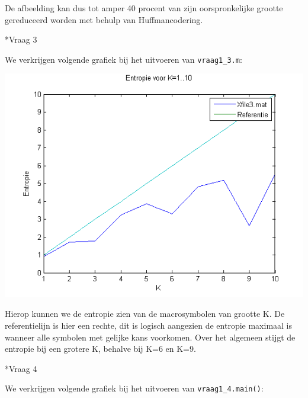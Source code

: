 \documentclass[]{article}
\begin{document}
\begin{section}
\begin{subsection}
        De afbeelding kan dus tot amper 40 procent van zijn
        oorspronkelijke grootte gereduceerd worden met behulp van
        Huffmancodering.

    \end{subsection}

    \begin{subsection}*{Vraag 3}

        We verkrijgen volgende grafiek bij het uitvoeren van
        \texttt{vraag1\_3.m}:

        \includegraphics{vraag1_3.png}

        Hierop kunnen we de entropie zien van de macrosymbolen van
        grootte K. De referentielijn is hier een rechte, dit is logisch
        aangezien de entropie maximaal is wanneer alle symbolen met
        gelijke kans voorkomen.
        Over het algemeen stijgt de entropie bij een grotere K, behalve
        bij K=6 en K=9.

    \end{subsection}

    \begin{subsection}*{Vraag 4}

        We verkrijgen volgende grafiek bij het uitvoeren van
        \texttt{vraag1\_4.main()}:


\end{subsection}
\end{section}
\end{document}
